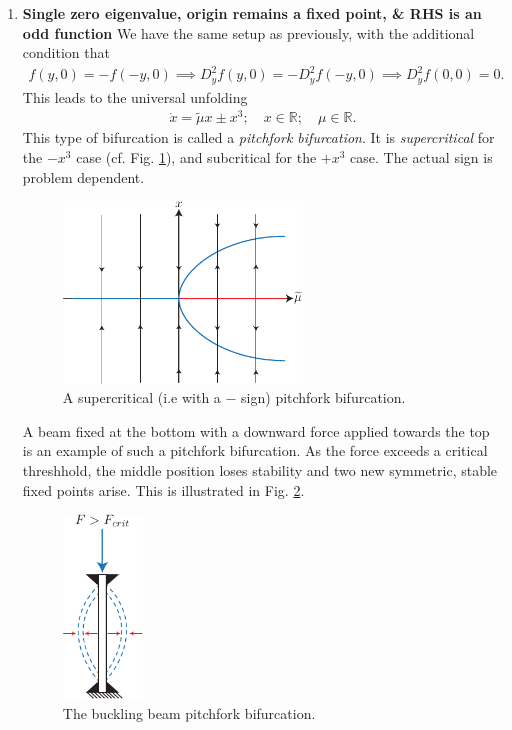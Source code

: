 \begin{enumerate}
	\item \textbf{Single zero eigenvalue, origin remains a fixed point, \& RHS is an odd function} 
		We have the same setup as previously, with the additional condition that
		\begin{align}
			f(y,0) = - f(-y,0)\implies D^2_{y}f(y,0) = -D^2_{y}f(-y,0) \implies D^2_{y}f(0,0) = 0.
		\end{align}
	This leads to the universal unfolding 
	\begin{align}
		\dot{x} = \tilde{\mu } x \pm x^3;\quad x \in \mathbb{R};\quad \mu \in \mathbb{R}.
	\end{align}
	This type of bifurcation is called a \emph{pitchfork bifurcation}. It is \emph{supercritical} for the $-x^3$ case (cf. Fig. \ref{fig:pitchfork_bif}), and subcritical for the $+x^3$ case. The actual sign is problem dependent.
\begin{figure}[h!]
	\centering
	\includegraphics[width=0.6\textwidth]{figures/ch3/16pitchfork_bif_A.pdf}
	\caption{A supercritical (i.e with a $-$ sign) pitchfork bifurcation.}
	\label{fig:pitchfork_bif}
\end{figure}

\begin{ex}
	A beam fixed at the bottom with a downward force applied towards the top is an example of such a pitchfork bifurcation. As the force exceeds a critical threshhold, the middle position loses stability and two new symmetric, stable fixed points arise. This is illustrated in Fig. \ref{fig:buckling_beam}.
	\begin{figure}[h!]
		\centering
		\includegraphics[width=0.2\textwidth]{figures/ch3/16buckling_beam_bif.pdf}
		\caption{The buckling beam pitchfork bifurcation.}
		\label{fig:buckling_beam}
	\end{figure}
	

\end{ex}
\end{enumerate}
